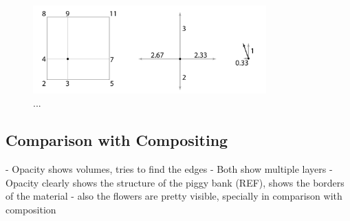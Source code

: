  





\begin{figure}[h!]
    \centering
    \captionsetup{justification=centering,margin=0.5cm}
    \includegraphics[width=0.8\textwidth]{img/local_gradient_vector.pdf}
    \caption{...}
    \label{fig:vector}
\end{figure}


\subsection{Comparison with Compositing}\label{subsec:opacity_compare}

- Opacity shows volumes, tries to find the edges
- Both show multiple layers
- Opacity clearly shows the structure of the piggy bank (REF), shows the borders of the material
- also the flowers are pretty visible, specially in comparison with composition



